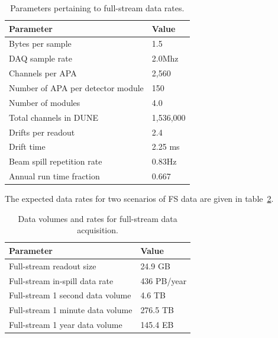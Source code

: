 \begin{table}[ht!]
	\centering
	\begin{tabular}{| p{3in} | p{2.5in} |}
		\hline

	\textbf{Parameter} & \textbf{Value} \\ \hline
	
	Bytes per sample & 1.5 \\ \hline
	
	DAQ sample rate & 2.0Mhz \\ \hline
	
	Channels per APA & 2,560 \\ \hline
	
	Number of APA per detector module & 150 \\ \hline
	
	Number of modules & 4.0 \\ \hline
	
	Total channels in DUNE & 1,536,000 \\ \hline
	
	Drifts per readout & 2.4 \\ \hline
	
	Drift time & 2.25 ms \\ \hline
	
	Beam spill repetition rate & 0.83Hz \\ \hline
	
	Annual run time fraction & 0.667 \\ \hline
	\end{tabular}
	\caption{Parameters pertaining to full-stream data rates.}
	\label{tab:full-stream-parameters}
\end{table}
The expected data rates for two scenarios of FS data are given
in table~\ref{tab:full-stream-volume}.
\begin{table}[ht!]
	\centering
	\begin{tabular}{| p{3in} | p{2.5in} |}
		\hline	
	
	\textbf{Parameter} & \textbf{Value} \\ \hline
	Full-stream readout size & 24.9 GB \\ \hline
	Full-stream in-spill data rate & 436 PB/year \\ \hline
	Full-stream 1 second data volume & 4.6 TB \\
	Full-stream 1 minute data volume & 276.5 TB \\	\hline
	Full-stream 1 year data volume & 145.4 EB \\ \hline
	\end{tabular}
	\caption{Data volumes and rates for full-stream data acquisition.}
	\label{tab:full-stream-volume}
\end{table}

